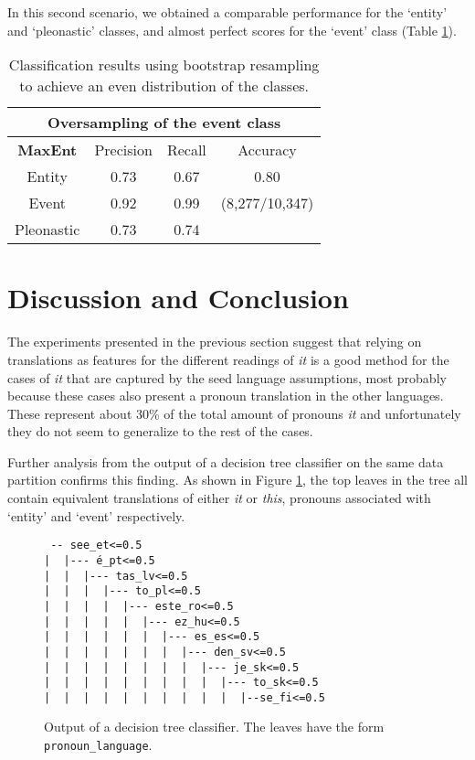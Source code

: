 \documentclass[10pt, a4paper]{article}
\begin{document}
In this second scenario, we obtained a comparable performance for the `entity' and `pleonastic' classes, and almost perfect scores for the `event' class (Table \ref{tab:maxentoversampling}). 

\begin{center} \begin{table}[h!] \begin{tabular}{cccc}
\multicolumn{4}{c}{\textbf{Oversampling of the event class}}\\ 
\toprule
\textbf{MaxEnt}& Precision & Recall & Accuracy \\ 
\midrule 
 Entity & 0.73 &0.67& 0.80 \\ 
 Event & 0.92 & 0.99 & (8,277/10,347) \\ 
  Pleonastic &  0.73 & 0.74 & \\
\bottomrule 
\end{tabular} 
\caption{Classification results using bootstrap
resampling to achieve an even distribution of the classes.}\label{tab:maxentoversampling}
\end{table}
\end{center}





\section{Discussion and Conclusion}

The experiments presented in the previous section suggest that relying on 
translations as features for the different readings of \textit{it} is a good 
method for 
the cases of \textit{it} that are captured by the seed language assumptions, 
most probably because  
these cases also present a pronoun translation in the other languages. These 
represent about 30\% of the total amount of pronouns 
\textit{it} and unfortunately they do not seem to generalize to the rest of the 
cases. 

Further analysis from the output of a decision tree classifier on the same data 
partition confirms this finding. As shown in Figure \ref{fig:decisiontree}, the 
top leaves in the tree all contain equivalent translations of either \textit{it} or 
\textit{this}, pronouns associated with `entity' and `event' respectively. 


\begin{figure}\small
\begin{verbatim}
 -- see_et<=0.5
|  |--- é_pt<=0.5
|  |  |--- tas_lv<=0.5
|  |  |  |--- to_pl<=0.5
|  |  |  |  |--- este_ro<=0.5
|  |  |  |  |  |--- ez_hu<=0.5
|  |  |  |  |  |  |--- es_es<=0.5
|  |  |  |  |  |  |  |--- den_sv<=0.5
|  |  |  |  |  |  |  |  |--- je_sk<=0.5
|  |  |  |  |  |  |  |  |  |--- to_sk<=0.5
|  |  |  |  |  |  |  |  |  |  |--se_fi<=0.5
\end{verbatim}
\caption{Output of a decision tree classifier. The leaves have the form \texttt{pronoun\_language}.}\label{fig:decisiontree}
\end{figure}
\end{document}
